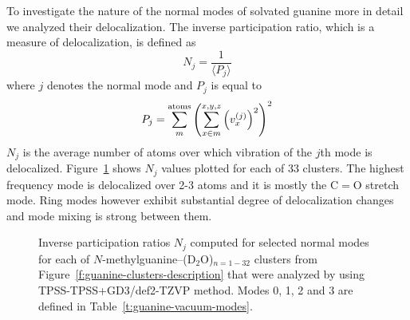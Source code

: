\documentclass[a4paper,titlepage,twoside,fleqn,12pt]{book}
\begin{document}
To investigate the nature of the normal modes of solvated guanine
more in detail we analyzed their delocalization. The inverse
participation ratio, which is a measure of delocalization, 
is defined as 
%
\begin{equation}  \label{e:ipr}
 N_j = \frac{1}{\langle P_j \rangle}
\end{equation}
%
where $j$ denotes the normal mode and $P_j$
is equal to
%
\begin{equation}  
 P_j = \sum_m^{\rm atoms} \left( 
         \sum_{x \in m}^{x,y,z} \left( v^{(j)}_x \right)^2
              \right)^2
\end{equation}
%
$N_j$ is the average number of atoms over which vibration of the $j$th
mode is delocalized. Figure~\ref{f:guanine-clusters-ipr} shows $N_j$ values
plotted for each of 33 clusters. The highest frequency mode
is delocalized over 2-3 atoms and it is mostly the C$=$O stretch mode.
Ring modes however exhibit substantial degree of delocalization changes
and mode mixing is strong between them.
%
\begin{figure}[t!]
\centering
\setlength\fboxsep{0.4pt}
\setlength\fboxrule{0.5pt}
\caption{
Inverse participation ratios $N_j$ computed for selected normal modes
for each of
$N$-methylguanine--(D$_2$O)$_{n=1-32}$ clusters from 
Figure~\ref{f:guanine-clusters-description} that were analyzed
by using TPSS-TPSS+GD3/def2-TZVP method. Modes 0, 1, 2 and 3
are defined in Table~\ref{t:guanine-vacuum-modes}.
\label{f:guanine-clusters-ipr}}
\end{figure}
%
\end{document}
